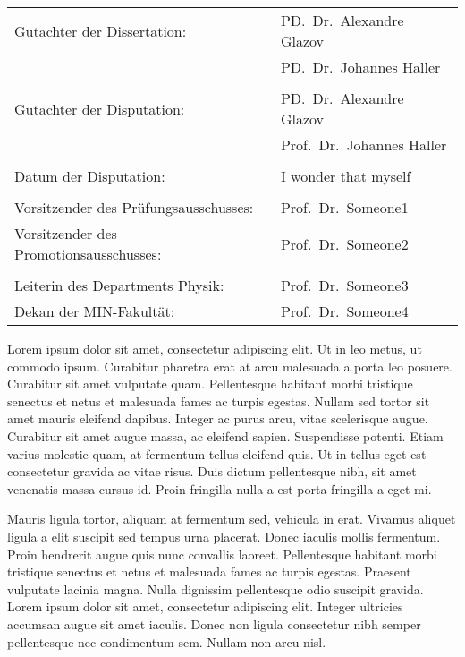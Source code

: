 \documentclass[oneside,11pt]{Classes/PhDthesisPSnPDF}
\begin{document}

\newpage
\thispagestyle{empty}
\vspace{12mm}
\begin{tabular}{ll}
Gutachter der Dissertation: & PD.~Dr.~Alexandre Glazov \\
                            & PD.~Dr.~Johannes Haller \\
    \\
Gutachter der Disputation:  & PD.~Dr.~Alexandre Glazov \\
							& Prof.~Dr.~Johannes Haller \\

    \\
Datum der Disputation: & I wonder that myself \\
\\
Vorsitzender des Pr\"ufungsausschusses: & Prof.~Dr.~Someone1 \\
Vorsitzender des Promotionsausschusses: & Prof.~Dr.~Someone2 \\
    \\
Leiterin des Departments Physik:        & Prof.~Dr.~Someone3 \\
Dekan der MIN-Fakult\"at:               & Prof.~Dr.~Someone4
\end{tabular}


\begin{abstracts}
 Lorem ipsum dolor sit amet, consectetur adipiscing elit. Ut in leo metus, ut commodo ipsum. Curabitur pharetra erat at arcu malesuada a porta leo posuere. Curabitur sit amet vulputate quam. Pellentesque habitant morbi tristique senectus et netus et malesuada fames ac turpis egestas. Nullam sed tortor sit amet mauris eleifend dapibus. Integer ac purus arcu, vitae scelerisque augue. Curabitur sit amet augue massa, ac eleifend sapien. Suspendisse potenti. Etiam varius molestie quam, at fermentum tellus eleifend quis. Ut in tellus eget est consectetur gravida ac vitae risus. Duis dictum pellentesque nibh, sit amet venenatis massa cursus id. Proin fringilla nulla a est porta fringilla a eget mi.

Mauris ligula tortor, aliquam at fermentum sed, vehicula in erat. Vivamus aliquet ligula a elit suscipit sed tempus urna placerat. Donec iaculis mollis fermentum. Proin hendrerit augue quis nunc convallis laoreet. Pellentesque habitant morbi tristique senectus et netus et malesuada fames ac turpis egestas. Praesent vulputate lacinia magna. Nulla dignissim pellentesque odio suscipit gravida. Lorem ipsum dolor sit amet, consectetur adipiscing elit. Integer ultricies accumsan augue sit amet iaculis. Donec non ligula consectetur nibh semper pellentesque nec condimentum sem. Nullam non arcu nisl.
\end{abstracts}
\end{document}
